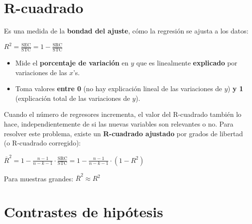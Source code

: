 \documentclass[10pt, a4paper, landscape]{extarticle}
\newcommand{\SRC}{\mathrm{SRC}}
\newcommand{\SEC}{\mathrm{SEC}}
\newcommand{\STC}{\mathrm{STC}}
\begin{document}
\begin{multicols}{3}
\section*{R-cuadrado}
	Es una medida de la \textbf{bondad del ajuste}, cómo la regresión se ajusta a los datos:
	\begin{center}
		$R^2 = \frac{\SEC}{\STC} = 1 - \frac{\SRC}{\STC}$
	\end{center}
	\begin{itemize}[leftmargin=*]
		\item Mide el \textbf{porcentaje de variación} en $y$ que es linealmente \textbf{explicado} por variaciones de las $x$'s.
		\item Toma valores \textbf{entre 0} (no hay explicación lineal de las variaciones de $y$) \textbf{y 1} (explicación total de las variaciones de $y$).
	\end{itemize}
	Cuando el número de regresores incrementa, el valor del R-cuadrado también lo hace, independientemente de si las nuevas variables son relevantes o no. Para resolver este problema, existe un \textbf{R-cuadrado ajustado} por grados de libertad (o R-cuadrado corregido):
	\begin{center}
		$\overline{R}^2 = 1 - \frac{n-1}{n-k-1} \cdot \frac{\SRC}{\STC} = 1 - \frac{n-1}{n-k-1} \cdot (1-R^2)$
	\end{center}
	Para muestras grandes: $\overline{R}^2 \approx R^2$

\section*{Contrastes de hipótesis}

\end{multicols}
\end{document}
